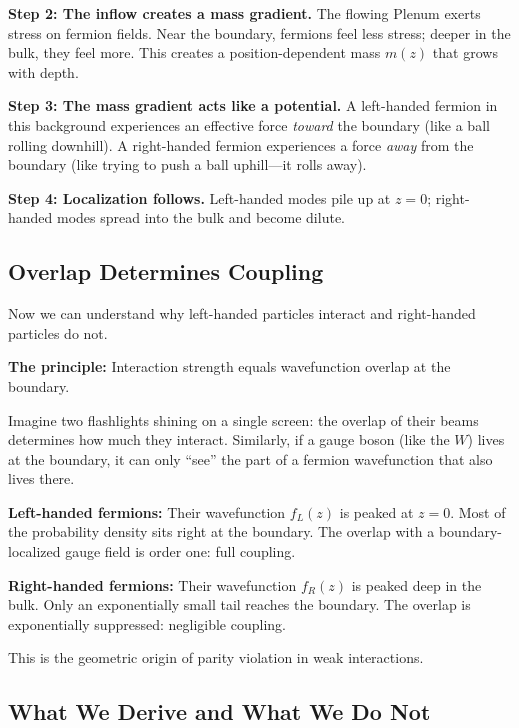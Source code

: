 \textbf{Step 2: The inflow creates a mass gradient.} The flowing Plenum exerts
stress on fermion fields. Near the boundary, fermions feel less stress; deeper
in the bulk, they feel more. This creates a position-dependent mass $m(z)$ that
grows with depth.

\textbf{Step 3: The mass gradient acts like a potential.} A left-handed fermion
in this background experiences an effective force \emph{toward} the boundary
(like a ball rolling downhill). A right-handed fermion experiences a force
\emph{away} from the boundary (like trying to push a ball uphill---it rolls away).

\textbf{Step 4: Localization follows.} Left-handed modes pile up at $z = 0$;
right-handed modes spread into the bulk and become dilute.


\subsection{Overlap Determines Coupling}

Now we can understand why left-handed particles interact and right-handed
particles do not.

\textbf{The principle:} Interaction strength equals wavefunction overlap at the
boundary.

Imagine two flashlights shining on a single screen: the overlap of their beams
determines how much they interact. Similarly, if a gauge boson (like the $W$)
lives at the boundary, it can only ``see'' the part of a fermion wavefunction
that also lives there.

\textbf{Left-handed fermions:} Their wavefunction $f_L(z)$ is peaked at $z = 0$.
Most of the probability density sits right at the boundary. The overlap with
a boundary-localized gauge field is order one: full coupling.

\textbf{Right-handed fermions:} Their wavefunction $f_R(z)$ is peaked deep in
the bulk. Only an exponentially small tail reaches the boundary. The overlap
is exponentially suppressed: negligible coupling.

This is the geometric origin of parity violation in weak interactions.


\subsection{What We Derive and What We Do Not}

